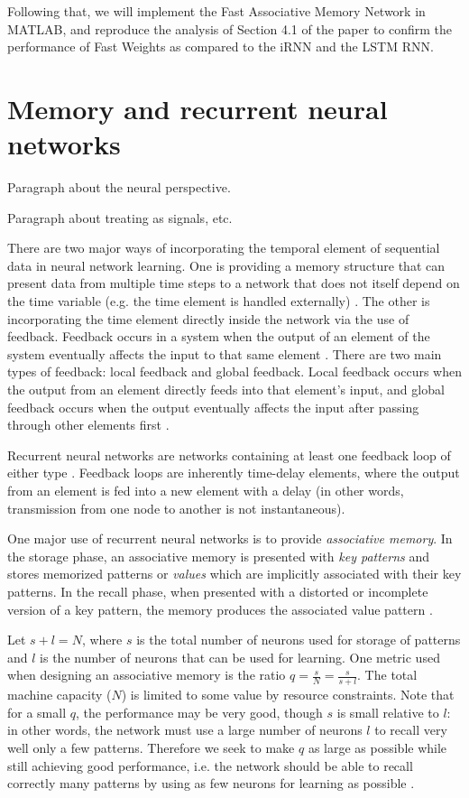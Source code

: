 Following that, we will implement the Fast Associative Memory Network in MATLAB, and reproduce the analysis of Section 4.1 \cite{DBLP:conf/nips/BaHMLI16} of the paper to confirm the performance of Fast Weights as compared to the iRNN and the LSTM RNN.

\section{Memory and recurrent neural networks}

Paragraph about the neural perspective.

Paragraph about treating as signals, etc.

There are two major ways of incorporating the temporal element of sequential data in neural network learning. One is providing a memory structure that can present data from multiple time steps to a network that does not itself depend on the time variable (e.g. the time element is handled externally) \cite[p. 672-673]{Haykin:2009:NNC:1213811}. The other is incorporating the time element directly inside the network via the use of feedback. Feedback occurs in a system when the output of an element of the system eventually affects the input to that same element \cite[p. 18]{Haykin:2009:NNC:1213811}. There are two main types of feedback: local feedback and global feedback. Local feedback occurs when the output from an element directly feeds into that element's input, and global feedback occurs when the output eventually affects the input after passing through other elements first \cite[p. 673]{Haykin:2009:NNC:1213811}.

Recurrent neural networks are networks containing at least one feedback loop of either type \cite[p. 23]{Haykin:2009:NNC:1213811}. Feedback loops are inherently time-delay elements, where the output from an element is fed into a new element with a delay (in other words, transmission from one node to another is not instantaneous).

One major use of recurrent neural networks is to provide \emph{associative memory}. In the storage phase, an associative memory is presented with \emph{key patterns} and stores memorized patterns or \emph{values} which are implicitly associated with their key patterns. In the recall phase, when presented with a distorted or incomplete version of a key pattern, the memory produces the associated value pattern \cite[p. 38]{Haykin:2009:NNC:1213811}.

Let $s + l = N$, where $s$ is the total number of neurons used for storage of patterns and $l$ is the number of neurons that can be used for learning. One metric used when designing an associative memory is the ratio $q = \frac{s}{N} = \frac{s}{s + l}$. The total machine capacity ($N$) is limited to some value by resource constraints. Note that for a small $q$, the performance may be very good, though $s$ is small relative to $l$: in other words, the network must use a large number of neurons $l$ to recall very well only a few patterns. Therefore we seek to make $q$ as large as possible while still achieving good performance, i.e. the network should be able to recall correctly many patterns by using as few neurons for learning as possible \cite[p. 39]{Haykin:2009:NNC:1213811}.

